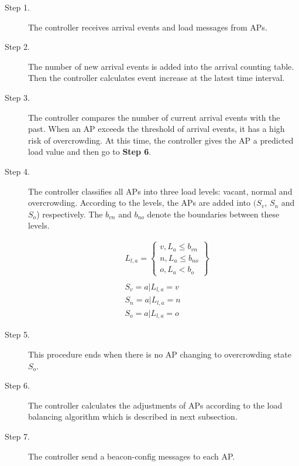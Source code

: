 \begin{description}
  \item [Step 1.] The controller receives arrival events and load messages from APs.
  \item [Step 2.] The number of new arrival events is added into the arrival counting table. Then the controller calculates event increase at the latest time interval.
  \item [Step 3.] The controller compares the number of current arrival events with the past. When an AP exceeds the threshold of arrival events, it has a high risk of overcrowding. At this time, the controller gives the AP a predicted load value and then go to \textbf{Step 6}.
  \item [Step 4.] The controller classifies all APs into three load levels: vacant, normal and overcrowding. According to the levels, the APs are added into $({S_v}$, ${S_n}$ and ${S_o}$) respectively. The $b_{vn}$ and $b_{no}$ denote the boundaries between these levels.

      \begin{align}
        &L_{l,a}=\left\{\begin{array}{lll}
            v, L_a \leq b_{vn} \\ n, L_a \leq b_{no} \\ o, L_a < b_o
            \end{array} \right\} \\
            \nonumber\\
        &S_v={a|L_{l,a}=v}\\
        &S_n={a|L_{l,a}=n}\\
        &S_o={a|L_{l,a}=o}
      \end{align}
  \item [Step 5.] This procedure ends when there is no AP changing to overcrowding state $S_o$.
  \item [Step 6.] The controller calculates the adjustments of APs according to the load balancing algorithm which is described in next subsection.
  \item [Step 7.] The controller send a beacon-config messages to each AP.
\end{description}

